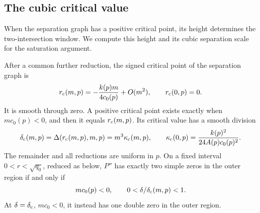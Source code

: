 \subsection{The cubic critical value}

When the separation graph has a positive critical point, its height determines the
two-intersection window. We compute this height and its cubic separation
scale for the saturation argument.

\begin{proposition}
\label{prop:cubic-curvature-window}
After a common further reduction, the signed critical point of the separation
graph is
\[
 r_{\rm c}(m,p)=-\frac{k(p)m}{4c_0(p)}+O(m^2),\qquad r_{\rm c}(0,p)=0.
\]
It is smooth through zero. A positive critical point exists exactly
when \(mc_0(p)<0\), and then it equals \(r_{\rm c}(m,p)\).
Its critical value has a smooth division
\begin{equation}\label{eq:cubic-critical-value}
 \delta_{\rm c}(m,p)=\Delta(r_{\rm c}(m,p),m,p)=m^3\kappa_{\rm c}(m,p),
 \qquad \kappa_{\rm c}(0,p)=\frac{k(p)^2}{24A(p)c_0(p)^2}.
\end{equation}
The remainder and all reductions are uniform in \(p\).
On a fixed interval \(0<r<\sqrt{q_0}\), reduced as below, \(P''\) has
exactly two simple zeros in the outer region if and only if
\begin{equation}\label{eq:curvature-window}
 mc_0(p)<0,\qquad 0<\delta/\delta_{\rm c}(m,p)<1.
\end{equation}
At \(\delta=\delta_{\rm c}\), \(mc_0<0\), it instead has one double zero
in the outer region.
\end{proposition}

